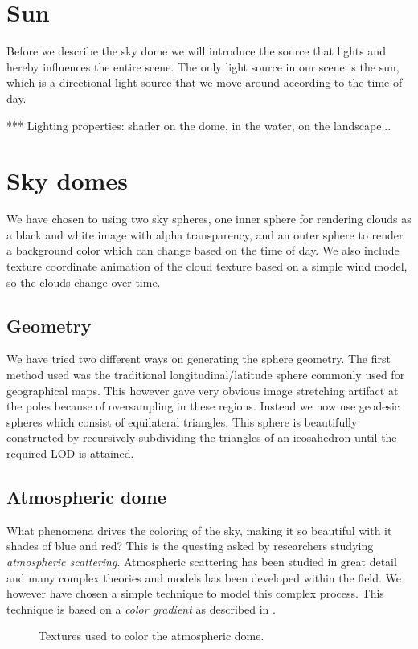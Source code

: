 \section{Sun}
Before we describe the sky dome we will introduce the source that lights
and hereby influences the entire scene. The only light source in our
scene is the sun, which is a directional light source that we move
around according to the time of day.

*** Lighting properties: shader on the dome, in the water, on the landscape...

\section{Sky domes}
We have chosen to using two sky spheres, one inner sphere for
rendering clouds as a black and white image with alpha transparency,
and an outer sphere to render a background color which can change
based on the time of day. We also include texture coordinate animation
of the cloud texture based on a simple wind model, so the clouds
change over time.

\subsection{Geometry}
We have tried two different ways on generating the sphere
geometry. The first method used was the traditional longitudinal/latitude
sphere commonly used for geographical maps. This
however gave very obvious image stretching artifact at the poles
because of oversampling in these regions. Instead we now use geodesic
spheres which consist of equilateral triangles. This sphere is
beautifully constructed by recursively subdividing the triangles of an
icosahedron until the required LOD is attained.

\subsection{Atmospheric dome}
What phenomena drives the coloring of the sky, making it so beautiful
with it shades of blue and red?
This is the questing asked by researchers studying 
\emph{atmospheric scattering}. Atmospheric scattering has been studied
in great detail and many complex theories and models has been
developed within the field. We however have chosen a simple technique
to model this complex process. This technique is based on a
\emph{color gradient} as described in .

\begin{figure}[!h]
  \centering
  \hspace{8mm}
  \caption{Textures used to color the atmospheric dome.}
  \label{fig:atmosphere}
\end{figure}

